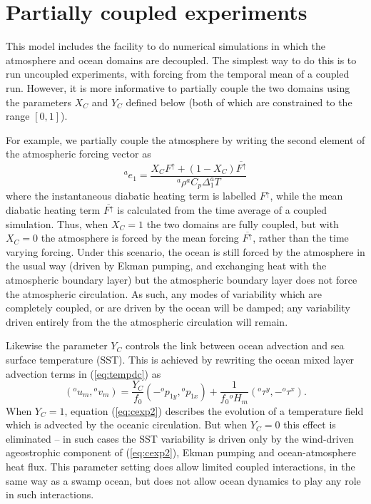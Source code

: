 \documentclass[11pt, a4paper,twoside]{article}
\newcommand{\dt}[2]{\Delta_{#2}^{#1}T}
\newcommand{\rhb}[1]{{{}^{#1}\rho}}
\newcommand{\cp}[1]{{{}^{#1}C_p}}
\newcommand{\p}[2]{{{}^{#1}p_{#2}}}
\newcommand{\uu}[2]{{{}^{#1}u_{#2}}}
\newcommand{\vv}[2]{{{}^{#1}v_{#2}}}
\newcommand{\HH}[2]{{{}^{#1}H_{#2}}}
\newcommand{\e}[2]{{{}^{#1}e_{#2}}}
\newcommand{\tx}[2]{{}^{#1}\tau^{#2}}
\newcommand{\Fup}[1]{{F^{\uparrow}_{#1}}}
\numberwithin{equation}{section}
\begin{document}
\section{Partially coupled experiments}\label{app:cexp}
This model includes the facility to do numerical simulations in which the atmosphere and ocean domains are decoupled.
The simplest way to do this is to run uncoupled experiments, with forcing from the temporal mean of a coupled run.
However, it is more informative to partially couple the two domains using the parameters $X_C$ and $Y_C$ defined below (both of which are constrained to the range $[0,1]$).

For example, we partially couple the atmosphere by writing the second element of the atmospheric forcing vector as 
\begin{equation}
\label{eq:cexp1}
\e{a}{1} = \frac{X_C\Fup{} + (1-X_C)\overline{\Fup{}}}{\rhb{a} \cp{a} \dt{a}{1} }
\end{equation}
where the instantaneous diabatic heating term is labelled $\Fup{}$, while the mean diabatic heating term $\overline{\Fup{}}$ is calculated from the time average of a coupled simulation.
Thus, when $X_C=1$ the two domains are fully coupled, but with $X_C=0$ the atmosphere is forced by the mean forcing $\overline{\Fup{}{}}$, rather than the time varying forcing. 
Under this scenario, the ocean is still forced by the atmosphere in the usual way (driven by Ekman pumping, and exchanging heat with the atmospheric boundary layer) but the atmospheric boundary layer does not force the atmospheric circulation.
As such, any modes of variability which are completely coupled, or are driven by the ocean will be damped; any variability driven entirely from the the atmospheric circulation will remain.

Likewise the parameter $Y_C$ controls the link between ocean advection and sea surface temperature (SST).
This is achieved by rewriting the ocean mixed layer advection terms in (\ref{eq:tempdc}) as
\begin{equation}
\label{eq:cexp2}
(\uu{o}{m},\vv{o}{m}) = \frac{Y_C}{f_0}(-\p{o}{1y},\p{o}{1x}) + \frac{1}{f_0\HH{o}{m}}(\tx{o}{y},-\tx{o}{x}).
\end{equation}
When $Y_C=1$, equation (\ref{eq:cexp2}) describes the evolution of a temperature field which is advected by the oceanic circulation. 
But when $Y_C=0$ this effect is eliminated -- in such cases the SST variability is driven only by the wind-driven ageostrophic component of (\ref{eq:cexp2}), Ekman pumping and ocean-atmosphere heat flux.
This parameter setting does allow limited coupled interactions, in the same way as a swamp ocean, but does not allow ocean dynamics to play any role in such interactions.

\newpage


\end{document}
